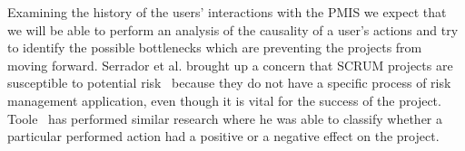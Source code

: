 \documentclass[a4paper, 12pt]{article}
\begin{document}
Examining the history of the users’ interactions with the PMIS we expect that we will be able to perform an analysis of the causality of a user’s actions and try to identify the possible bottlenecks which are preventing the projects from moving forward. Serrador et al. brought up a concern that SCRUM projects are susceptible to potential risk~\cite{tavares2019risk} because they do not have a specific process of risk management application, even though it is vital for the success of the project. Toole~\cite{Toole2006APM} has performed similar research where he was able to classify whether a particular performed action had a positive or a negative effect on the project. 

%
%
%
%
%
%
%
%
%
%
%
%
\end{document}
